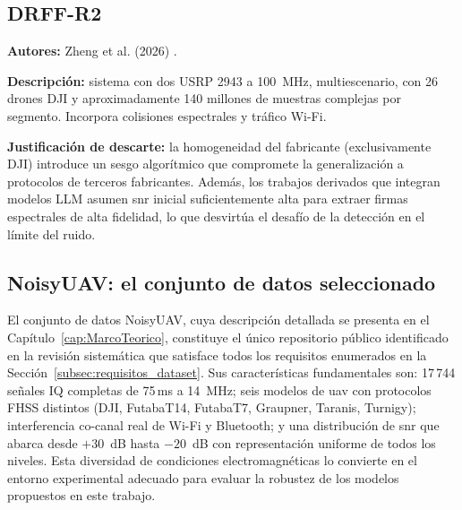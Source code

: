 \subsection{DRFF-R2}
\label{subsec:drff_r2}

\textbf{Autores:} Zheng et al. (2026) \cite{zheng_multi-scenario_2026}.

\textbf{Descripción:} sistema con dos USRP 2943 a 100\, MHz, multiescenario,
con 26 drones DJI y aproximadamente 140 millones de muestras complejas por segmento.
Incorpora colisiones espectrales y tráfico Wi-Fi.

\textbf{Justificación de descarte:} la homogeneidad del fabricante (exclusivamente
DJI) introduce un sesgo algorítmico que compromete la generalización a protocolos
de terceros fabricantes. Además, los trabajos derivados que integran modelos LLM
\cite{zheng_uav_2025} asumen \gls{snr} inicial suficientemente alta para extraer
firmas espectrales de alta fidelidad, lo que desvirtúa el desafío de la detección
en el límite del ruido.

\subsection{NoisyUAV: el conjunto de datos seleccionado}
\label{subsec:noisyuav}

El conjunto de datos NoisyUAV, cuya descripción detallada se presenta en el
Capítulo~\ref{cap:MarcoTeorico}, constituye el único repositorio público identificado
en la revisión sistemática que satisface todos los requisitos enumerados en la
Sección~\ref{subsec:requisitos_dataset}. Sus características fundamentales son:
17\,744 señales IQ completas de 75\,ms a 14\, MHz; seis modelos de \gls{uav} con
protocolos FHSS distintos (DJI, FutabaT14, FutabaT7, Graupner, Taranis, Turnigy);
interferencia co-canal real de Wi-Fi y Bluetooth; y una distribución de \gls{snr}
que abarca desde $+30$\, dB hasta $-20$\, dB con representación uniforme de todos
los niveles. Esta diversidad de condiciones electromagnéticas lo convierte en el
entorno experimental adecuado para evaluar la robustez de los modelos propuestos
en este trabajo.

